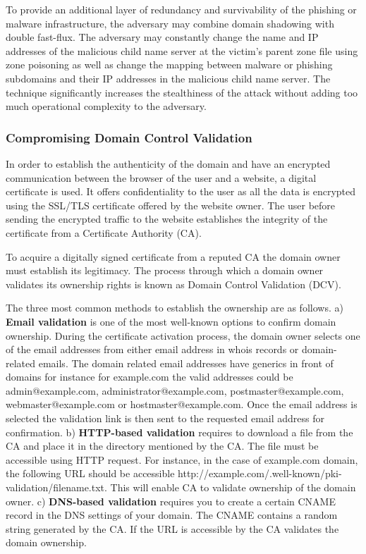 To provide an additional layer of redundancy and survivability of the phishing or malware infrastructure, the adversary may combine domain shadowing with double fast-flux.
The adversary may constantly change the name and IP addresses of the malicious child name server at the victim's parent zone file using zone poisoning as well as change the mapping between malware or phishing subdomains and their IP addresses in the malicious child name server. %
The technique significantly increases the stealthiness of the attack without adding too much operational complexity to the adversary. 


\subsubsection{Compromising Domain Control Validation\label{sec:domainvalidation}}


In order to establish the authenticity of the domain and have an encrypted communication between the browser of the user and a website, a digital certificate is used. It offers confidentiality to the user as all the data is encrypted using the SSL/TLS certificate offered by the website owner. The user before sending the encrypted traffic to the website establishes the integrity of the certificate from a  Certificate Authority (CA). 

To acquire a digitally signed certificate from a reputed CA  the domain owner must establish its legitimacy. The process through which a  domain owner validates its ownership rights is known as Domain Control Validation (DCV). 

The three most common methods to establish the ownership are as follows. 
a) \textbf {Email validation} is one of the most well-known options to confirm domain ownership. During the certificate activation process, the domain owner selects one of the email addresses from either email address in whois records or domain-related emails. The domain related email addresses have generics in front of domains for instance for example.com  the valid addresses could be admin@example.com, administrator@example.com, postmaster@example.com, webmaster@example.com or hostmaster@example.com. Once the email address is selected the validation link is then sent to the requested email address for confirmation. b) \textbf{HTTP-based validation} requires to download a file from the CA and place it in the directory mentioned by the CA. The file must be accessible using HTTP request. For instance, in the case of example.com domain, the following URL should be accessible http://example.com/.well-known/pki-validation/filename.txt. This will enable CA to validate ownership of the domain owner. c) \textbf{DNS-based validation} requires you to create a certain CNAME record in the DNS settings of your domain. The CNAME contains a random string generated by the CA. If the URL is accessible by the CA validates the domain ownership. 



